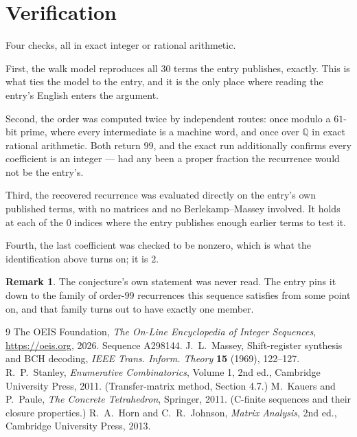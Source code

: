 \documentclass[11pt,a4paper]{article}
\theoremstyle{plain}
\theoremstyle{definition}
\newtheorem{remark}[theorem]{Remark}
\begin{document}
\section{Verification}

Four checks, all in exact integer or rational arithmetic.

First, the walk model reproduces all $30$ terms the entry publishes, exactly. This is
what ties the model to the entry, and it is the only place where reading the entry's English
enters the argument.

Second, the order was computed twice by independent routes: once modulo a $61$-bit prime, where
every intermediate is a machine word, and once over $\mathbb{Q}$ in exact rational arithmetic.
Both return $99$, and the exact run additionally confirms every coefficient is an integer
--- had any been a proper fraction the recurrence would not be the entry's.

Third, the recovered recurrence was evaluated directly on the entry's own published terms, with
no matrices and no Berlekamp--Massey involved. It holds at each of the $0$ indices where
the entry publishes enough earlier terms to test it.

Fourth, the last coefficient was checked to be nonzero, which is what the identification above
turns on; it is $2$.

\begin{remark}
The conjecture's own statement was never read. The entry pins it down to the family of
order-$99$ recurrences this sequence satisfies from some point on, and that family turns
out to have exactly one member.
\end{remark}

\begin{thebibliography}{9}
 The OEIS Foundation, \emph{The On-Line Encyclopedia of Integer
Sequences}, \url{https://oeis.org}, 2026. Sequence A298144.
 J.~L.~Massey, Shift-register synthesis and BCH decoding, \emph{IEEE
Trans. Inform. Theory} \textbf{15} (1969), 122--127.
 R.~P.~Stanley, \emph{Enumerative Combinatorics}, Volume 1, 2nd ed.,
Cambridge University Press, 2011. (Transfer-matrix method, Section 4.7.)
 M.~Kauers and P.~Paule, \emph{The Concrete Tetrahedron}, Springer, 2011.
(C-finite sequences and their closure properties.)
 R.~A.~Horn and C.~R.~Johnson, \emph{Matrix Analysis}, 2nd ed., Cambridge
University Press, 2013.
\end{thebibliography}
\end{document}
